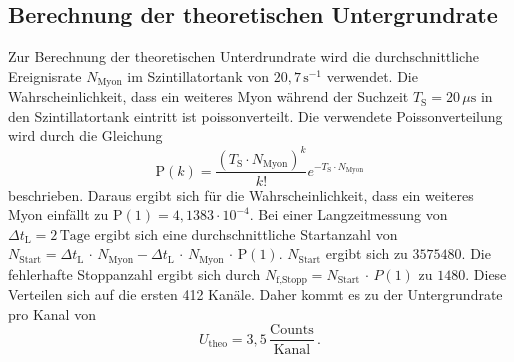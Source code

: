 \subsection{Berechnung der theoretischen Untergrundrate}
Zur Berechnung der theoretischen Unterdrundrate wird die durchschnittliche Ereignisrate $N_{\text{Myon}}$ im Szintillatortank von 
$20,7\,\unit{\second}^{-1}$ verwendet. Die Wahrscheinlichkeit, dass ein weiteres Myon während der Suchzeit $T_{\text{S}} = 20 \,\unit{\mu\second}$
in den Szintillatortank eintritt ist poissonverteilt. Die verwendete Poissonverteilung wird durch die Gleichung 
\begin{equation}
	\text{P}(k) = \frac{(T_{\text{S}} \cdot N_{\text{Myon}})^k}{k!} e^{- T_{\text{S}} \cdot N_{\text{Myon}}}
	\label{eqn:Poisson}
\end{equation}
beschrieben. Daraus ergibt sich für die Wahrscheinlichkeit, dass ein weiteres Myon einfällt zu $\text{P}(1) = 4,1383 \cdot 10^{-4}$.
Bei einer Langzeitmessung von $\Delta t_{\text{L}} = 2 \, \text{Tage} $ ergibt sich eine durchschnittliche Startanzahl von 
$N_{\text{Start}} = \Delta t_{\text{L}} \,\cdot \, N_{\text{Myon}} - \Delta t_{\text{L}} \, \cdot \, N_{\text{Myon}} \, \cdot \, \text{P}(1)$. 
$N_{\text{Start}}$ ergibt sich zu $3575480$. Die fehlerhafte Stoppanzahl ergibt sich durch 
$N_{\text{f,Stopp}} = N_{\text{Start}} \, \cdot \, P(1)$ zu $1480$. Diese Verteilen sich auf die ersten 412 Kanäle. Daher kommt es 
zu der Untergrundrate pro Kanal von $$U_{\text{theo}} = 3,5 \, \frac{\text{Counts}}{\text{Kanal}}\,.$$

%
%



